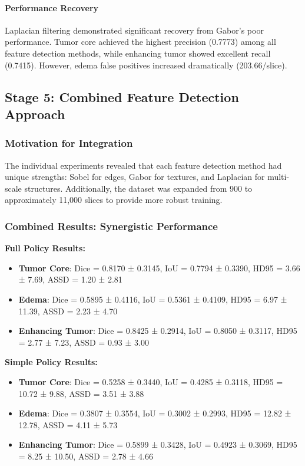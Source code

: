 \paragraph{Performance Recovery} Laplacian filtering demonstrated significant recovery from Gabor's poor performance. Tumor core achieved the highest precision (0.7773) among all feature detection methods, while enhancing tumor showed excellent recall (0.7415). However, edema false positives increased dramatically (203.66/slice).

\subsection{Stage 5: Combined Feature Detection Approach}

\subsubsection{Motivation for Integration}

The individual experiments revealed that each feature detection method had unique strengths: Sobel for edges, Gabor for textures, and Laplacian for multi-scale structures. Additionally, the dataset was expanded from 900 to approximately 11,000 slices to provide more robust training.

\subsubsection{Combined Results: Synergistic Performance}

\textbf{Full Policy Results:}
\begin{itemize}
    \item \textbf{Tumor Core}: Dice = 0.8170 ± 0.3145, IoU = 0.7794 ± 0.3390, HD95 = 3.66 ± 7.69, ASSD = 1.20 ± 2.81
    \item \textbf{Edema}: Dice = 0.5895 ± 0.4116, IoU = 0.5361 ± 0.4109, HD95 = 6.97 ± 11.39, ASSD = 2.23 ± 4.70
    \item \textbf{Enhancing Tumor}: Dice = 0.8425 ± 0.2914, IoU = 0.8050 ± 0.3117, HD95 = 2.77 ± 7.23, ASSD = 0.93 ± 3.00
\end{itemize}

\textbf{Simple Policy Results:}
\begin{itemize}
    \item \textbf{Tumor Core}: Dice = 0.5258 ± 0.3440, IoU = 0.4285 ± 0.3118, HD95 = 10.72 ± 9.88, ASSD = 3.51 ± 3.88
    \item \textbf{Edema}: Dice = 0.3807 ± 0.3554, IoU = 0.3002 ± 0.2993, HD95 = 12.82 ± 12.78, ASSD = 4.11 ± 5.73
    \item \textbf{Enhancing Tumor}: Dice = 0.5899 ± 0.3428, IoU = 0.4923 ± 0.3069, HD95 = 8.25 ± 10.50, ASSD = 2.78 ± 4.66
\end{itemize}

